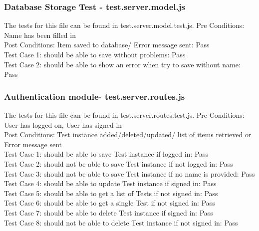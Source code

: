 \documentclass[a4paper,12pt]{report}
\begin{document}
\subsubsection{Database Storage Test - test.server.model.js}
The tests for this file can be found in test.server.model.test.js.
Pre Conditions: Name has been filled in\\
Post Conditions: Item saved to database/ Error message sent: Pass \\
Test Case 1: should be able to save without problems: Pass\\
Test Case 2:  should be able to show an error when try to save without name: Pass\\

\subsubsection{ Authentication module- test.server.routes.js}
The tests for this file can be found in test.server.routes.test.js.
Pre Conditions: User has logged on, User has signed in\\
Post Conditions: Test instance added/deleted/updated/ list of items retrieved or Error message sent \\
Test Case 1: should be able to save Test instance if logged in: Pass\\
Test Case 2: should not be able to save Test instance if not logged in: Pass\\
Test Case 3: should not be able to save Test instance if no name is provided: Pass\\
Test Case 4: should be able to update Test instance if signed in: Pass\\
Test Case 5: should be able to get a list of Tests if not signed in: Pass\\
Test Case 6: should be able to get a single Test if not signed in: Pass\\
Test Case 7: should be able to delete Test instance if signed in: Pass\\
Test Case 8: should not be able to delete Test instance if not signed in: Pass
\end{document}

